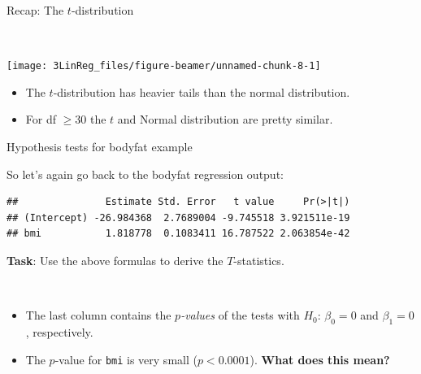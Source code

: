 \documentclass[10pt,ignorenonframetext,]{beamer}
\newenvironment{Shaded}{\begin{snugshade}}{\end{snugshade}}
\newcommand{\KeywordTok}[1]{\textcolor[rgb]{0.13,0.29,0.53}{\textbf{#1}}}
\newcommand{\OperatorTok}[1]{\textcolor[rgb]{0.81,0.36,0.00}{\textbf{#1}}}
\newcommand{\NormalTok}[1]{#1}
\providecommand{\tightlist}{%
  \setlength{\itemsep}{0pt}\setlength{\parskip}{0pt}}
\begin{document}
\begin{frame}

\begin{block}{Recap: The \(t\)-distribution}

\(~\)

\begin{center}\texttt{[image: 3LinReg\_files/figure-beamer/unnamed-chunk-8-1]} \end{center}

\normalsize

\begin{itemize}
\tightlist
\item
  The \(t\)-distribution has heavier tails than the normal distribution.
\item
  For df \(\geq 30\) the \(t\) and Normal distribution are pretty
  similar.
\end{itemize}

\end{block}

\end{frame}

\begin{frame}[fragile]

\begin{block}{Hypothesis tests for bodyfat example}

\vspace{2mm}

So let's again go back to the bodyfat regression output:

\scriptsize

\begin{Shaded}
\end{Shaded}

\begin{verbatim}
##               Estimate Std. Error   t value     Pr(>|t|)
## (Intercept) -26.984368  2.7689004 -9.745518 3.921511e-19
## bmi           1.818778  0.1083411 16.787522 2.063854e-42
\end{verbatim}

\normalsize

\textbf{Task}: Use the above formulas to derive the \(T\)-statistics.

\(~\)

\begin{itemize}
\item
  The last column contains the \emph{\(p\)-values} of the tests with
  \(H_0\): \(\beta_0=0\) and \(\beta_1=0\), respectively.
\item
  The \(p\)-value for \texttt{bmi} is very small (\(p<0.0001\)).
  \textbf{What does this mean?}
\end{itemize}

\end{block}

\end{frame}
\end{document}
